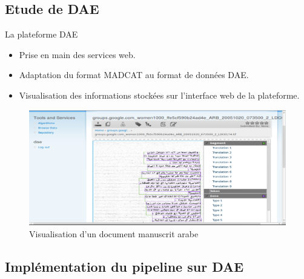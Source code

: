 \documentclass[c]{beamer}
\begin{document}
\subsection{Etude de DAE}
\begin{frame}

\begin{block}{La plateforme DAE}
\begin{itemize}
\item Prise en main des services web.
\item Adaptation du format MADCAT au format de données DAE.
\item Visualisation des informations stockées sur l'interface web de la plateforme.
\end{itemize}
\end{block}
\begin{figure}
\includegraphics[scale=.1]{DAEElements}
\\Visualisation d'un document manuscrit arabe
\end{figure}

\end{frame}
\subsection{Implémentation du pipeline sur DAE}
\end{document}
